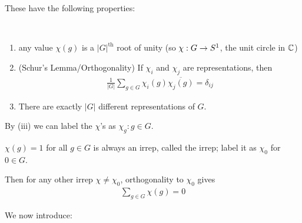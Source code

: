 \documentclass[]{article}
\begin{document}
These have the following properties:

\begin{theorem*}[Theorem A]\ 
\begin{enumerate}[label=(\roman*)]
	\item any value $\chi(g)$ is a $|G|^{\textrm{th}}$ root of unity (so $\chi : G\rightarrow S^1$, the unit circle in $\mathbb{C}$)
	\item (Schur's Lemma/Orthogonality) If $\chi_i$ and $\chi_j$ are representations, then
	\begin{align*}
		\frac{1}{|G|} \sum_{g\in G} \chi_i(g)\overline{\chi_j(g)} = \delta_{ij}
	\end{align*}
	\item There are exactly $|G|$ different representations of $G$.
\end{enumerate}
\end{theorem*}

By (iii) we can label the $\chi$'s as $\chi_g: g\in G$.

\begin{remark*}[Example]
$\chi(g) = 1$ for all $g\in G$ is always an irrep, called the  irrep; label it as $\chi_0$ for $0\in G$.

Then for any other irrep $\chi\ne \chi_0$, orthogonality to $\chi_0$ gives
\begin{align*}
	\sum_{g\in G}\chi(g) = 0
\end{align*}
\end{remark*}

We now introduce:
\end{document}
